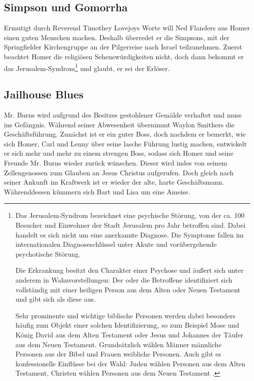 \subsection{Simpson und Gomorrha}
Ermutigt durch Reverend Timothey Lovejoys Worte will Ned Flanders aus Homer einen guten Menschen machen. Deshalb überredet er die Simpsons, mit der Springfielder Kirchengruppe an der Pilgerreise nach Israel teilzunehmen. Zuerst beachtet Homer die religiösen Sehenswürdig\-kei\-ten nicht, doch dann bekommt er das Jerusalem-Syndrom\footnote{Das Jerusalem-Syndrom bezeichnet eine psychische Störung, von der ca. 100 Besucher und Einwohner der Stadt Jerusalem pro Jahr betroffen sind. Dabei handelt es sich nicht um eine anerkannte Diagnose. Die Symptome fallen im internationalen Diagnoseschlüssel unter \glqq Akute und vorübergehende psychotische Störung\grqq .

Die Erkrankung besitzt den Charakter einer Psychose und äußert sich unter anderem in Wahnvorstellungen: Der oder die Betroffene identifiziert sich vollständig mit einer heiligen Person aus dem Alten oder Neuen Testament und gibt sich als diese aus.

Sehr prominente und wichtige biblische Personen werden dabei besonders häufig zum Objekt einer solchen Identifizierung, so zum Beispiel Mose und König David aus dem Alten Testament oder Jesus und Johannes der Täufer aus dem Neuen Testament. Grundsätzlich wählen Männer männliche Personen aus der Bibel und Frauen weibliche Personen. Auch gibt es konfessionelle Einflüsse bei der Wahl: Juden wählen Personen aus dem Alten Testament, Christen wählen Personen aus dem Neuen Testament \cite{JerusalemSyndrom}.} und glaubt, er sei der Erlöser. 



\subsection{Jailhouse Blues}\label{MABF08}
Mr. Burns wird aufgrund des Besitzes gestohlener Gemälde verhaftet und muss ins Gefängnis. Während seiner Abwesenheit übernimmt Waylon Smithers die Geschäftsführung. Zunächst ist er ein guter Boss, doch nachdem er bemerkt, wie sich Homer, Carl und Lenny über seine lasche Führung lustig machen, entwickelt er sich mehr und mehr zu einem strengen Boss, sodass sich Homer und seine Freunde Mr. Burns wieder zurück wünschen. Dieser wird indes von seinem Zellengenossen zum Glauben an Jesus Christus aufgerufen. Doch gleich nach seiner Ankunft im Kraftwerk ist er wieder der alte, harte Geschäftsmann. Währenddessen kümmern sich Bart und Lisa um eine Ameise. 

